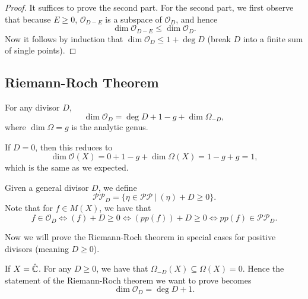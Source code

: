 \documentclass{article}
\begin{document}
{\begin{proof}
It suffices to prove the second part. For the second part, we first observe that because $E \geq 0$, $\mathcal{O}_{D - E}$ is a subspace of $\mathcal{O}_D$, and hence
\[\dim \mathcal{O}_{D - E} \leq \dim \mathcal{O}_D.\]
Now it follows by induction that $\dim \mathcal{O}_D \leq 1 + \deg D$ (break $D$ into a finite sum of single points).
    
\end{proof}

\subsection{Riemann-Roch Theorem}

\begin{theorem}
    For any divisor $D$, 
    \[\dim \mathcal{O}_D = \deg D + 1 - g + \dim \Omega_{-D},\]
    where $\dim \Omega = g$ is the analytic genus. 
\end{theorem}

\begin{corollary}
    If $D = 0$, then this reduces to
    \[\dim \mathcal{O}(X) =  0 + 1 - g + \dim \Omega(X) = 1 - g + g = 1,\]
    which is the same as we expected.
\end{corollary}

\begin{definition}
        Given a general divisor $D$, we define
    \[\mathcal{P}\mathcal{P}_D = \{\eta \in \mathcal{P} \mathcal{P}\ |\ (\eta) + D \geq 0\}. \]
    Note that for $f \in M(X)$, we have that
    \[f \in \mathcal{O}_D \iff (f) + D \geq 0 \iff (pp(f)) + D \geq 0 \iff pp(f) \in \mathcal{P}\mathcal{P}_D.\]
\end{definition}

Now we will prove the Riemann-Roch theorem in special cases for positive divisors (meaning $D \geq 0$).
\begin{example}
    If $X = \hat{\mathbb{C}}$. For any $D \geq 0$, we have that $\Omega_{-D}(X) \subseteq \Omega(X) = 0$. Hence the statement of the Riemann-Roch theorem we want to prove becomes
    \[\dim \mathcal{O}_D = \deg D + 1.\]


\end{example}}
\end{document}
